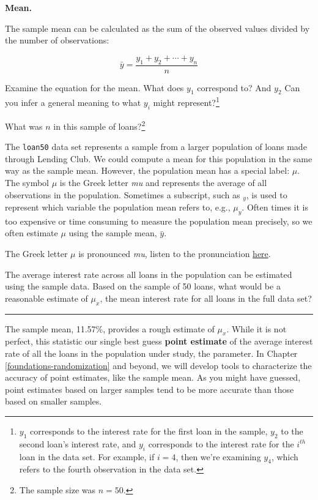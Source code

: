 \documentclass[
  10pt,
  openany]{book}
\theoremstyle{definition}
\theoremstyle{definition}
\theoremstyle{definition}
\theoremstyle{definition}
\theoremstyle{remark}
\begin{document}
\textbf{Mean.}

The sample mean can be calculated as the sum of the observed values divided by the number of observations:

\[ \bar{y} = \frac{y_1 + y_2 + \cdots + y_n}{n} \]

Examine the equation for the mean. What does \(y_1\) correspond to? And \(y_2\) Can you infer a general meaning to what \(y_i\) might represent?\footnote{\(y_1\) corresponds to the interest rate for the first loan in the sample, \(y_2\) to the second loan's interest rate, and \(y_i\) corresponds to the interest rate for the \(i^{th}\) loan in the data set. For example, if \(i = 4\), then we're examining \(y_4\), which refers to the fourth observation in the data set.}

What was \(n\) in this sample of loans?\footnote{The sample size was \(n = 50\).}

The \texttt{loan50} data set represents a sample from a larger population of loans made through Lending Club.
We could compute a mean for this population in the same way as the sample mean.
However, the population mean has a special label: \(\mu\).
The symbol \(\mu\) is the Greek letter \emph{mu} and represents the average of all observations in the population.
Sometimes a subscript, such as \(_y\), is used to represent which variable the population mean refers to, e.g., \(\mu_y\).
Often times it is too expensive or time consuming to measure the population mean precisely, so we often estimate \(\mu\) using the sample mean, \(\bar{y}\).

The Greek letter \(\mu\) is pronounced \emph{mu}, listen to the pronunciation \href{https://youtu.be/PStgY5AcEIw?t=47}{here}.

The average interest rate across all loans in the population can be estimated using the sample data. Based on the sample of 50 loans, what would be a reasonable estimate of \(\mu_x\), the mean interest rate for all loans in the full data set?

\begin{center}\rule{0.5\linewidth}{0.5pt}\end{center}

The sample mean, 11.57\%, provides a rough estimate of \(\mu_x\). While it is not perfect, this statistic our single best guess \textbf{point estimate} of the average interest rate of all the loans in the population under study, the parameter. In Chapter \ref{foundations-randomization} and beyond, we will develop tools to characterize the accuracy of point estimates, like the sample mean. As you might have guessed, point estimates based on larger samples tend to be more accurate than those based on smaller samples.
\end{document}
